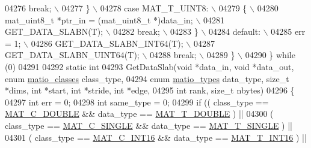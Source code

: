 \begin{DoxyCode}
{{{{{{{{{{{{{{{{{{{{{{{{{04276 \textcolor{preprocessor}{                break; \(\backslash\)}
04277 \textcolor{preprocessor}{            \} \(\backslash\)}
04278 \textcolor{preprocessor}{            case MAT\_T\_UINT8: \(\backslash\)}
04279 \textcolor{preprocessor}{            \{ \(\backslash\)}
04280 \textcolor{preprocessor}{                mat\_uint8\_t *ptr\_in = (mat\_uint8\_t *)data\_in; \(\backslash\)}
04281 \textcolor{preprocessor}{                GET\_DATA\_SLABN(T); \(\backslash\)}
04282 \textcolor{preprocessor}{                break; \(\backslash\)}
04283 \textcolor{preprocessor}{            \} \(\backslash\)}
04284 \textcolor{preprocessor}{            default: \(\backslash\)}
04285 \textcolor{preprocessor}{                err = 1; \(\backslash\)}
04286 \textcolor{preprocessor}{                GET\_DATA\_SLABN\_INT64(T); \(\backslash\)}
04287 \textcolor{preprocessor}{                GET\_DATA\_SLABN\_UINT64(T); \(\backslash\)}
04288 \textcolor{preprocessor}{                break; \(\backslash\)}
04289 \textcolor{preprocessor}{        \} \(\backslash\)}
04290 \textcolor{preprocessor}{    \} while (0)}
04291 
04292 \textcolor{keyword}{static} \textcolor{keywordtype}{int}
04293 GetDataSlab(\textcolor{keywordtype}{void} *data\_in, \textcolor{keywordtype}{void} *data\_out, \textcolor{keyword}{enum} \hyperlink{group___m_a_t_gad4d60ae7b709fc81bfd744fb4c857c40}{matio\_classes} class\_type,
04294     \textcolor{keyword}{enum} \hyperlink{group___m_a_t_gacf7b3b879282b7ab3a51190e49bf3453}{matio\_types} data\_type, \textcolor{keywordtype}{size\_t} *dims, \textcolor{keywordtype}{int} *start, \textcolor{keywordtype}{int} *stride, \textcolor{keywordtype}{int} *edge,
04295     \textcolor{keywordtype}{int} rank, \textcolor{keywordtype}{size\_t} nbytes)
04296 \{
04297     \textcolor{keywordtype}{int} err = 0;
04298     \textcolor{keywordtype}{int} same\_type = 0;
04299     \textcolor{keywordflow}{if} (( class\_type == \hyperlink{group___m_a_t_ggad4d60ae7b709fc81bfd744fb4c857c40a5d70e0862e5bdb7bd86bf7ba5948f307}{MAT\_C\_DOUBLE} && data\_type == \hyperlink{group___m_a_t_ggacf7b3b879282b7ab3a51190e49bf3453a31e721ecf7e188196f83c32838288797}{MAT\_T\_DOUBLE} ) ||
04300         ( class\_type == \hyperlink{group___m_a_t_ggad4d60ae7b709fc81bfd744fb4c857c40a2825631e26a961cbe0f79db50a39cea2}{MAT\_C\_SINGLE} && data\_type == \hyperlink{group___m_a_t_ggacf7b3b879282b7ab3a51190e49bf3453a3a3657d40e9212c923d9b9d03531b64c}{MAT\_T\_SINGLE} ) ||
04301         ( class\_type == \hyperlink{group___m_a_t_ggad4d60ae7b709fc81bfd744fb4c857c40a40370e9de516c5036a67a5865c071006}{MAT\_C\_INT16} && data\_type == \hyperlink{group___m_a_t_ggacf7b3b879282b7ab3a51190e49bf3453a8c5b2e381946e95ea8d81ac216743302}{MAT\_T\_INT16} ) ||
}}}}}}}}}}}}}}}}}}}}}}}}}
\end{DoxyCode}
